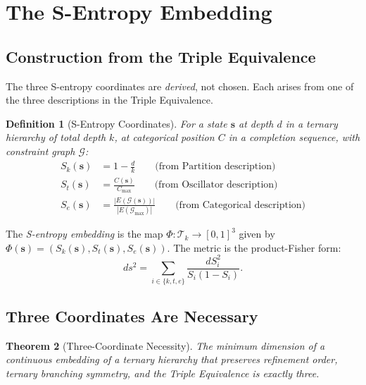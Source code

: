 \documentclass[twocolumn,11pt,a4paper]{article}
\newtheorem{theorem}{Theorem}[section]
\newtheorem{definition}[theorem]{Definition}
\newcommand{\Skk}{S_k}
\newcommand{\Stt}{S_t}
\newcommand{\See}{S_e}
\begin{document}
\section{The S-Entropy Embedding}
\label{sec:s_entropy_embedding}

\subsection{Construction from the Triple Equivalence}

The three S-entropy coordinates are \emph{derived}, not chosen. Each arises from one of the three descriptions in the Triple Equivalence.

\begin{definition}[S-Entropy Coordinates]
\label{def:s_entropy}
For a state $\mathbf{s}$ at depth $d$ in a ternary hierarchy of total depth $k$, at categorical position $C$ in a completion sequence, with constraint graph $\mathcal{G}$:
\begin{align}
\Skk(\mathbf{s}) &= 1 - \frac{d}{k} \qquad \text{(from Partition description)} \\
\Stt(\mathbf{s}) &= \frac{C(\mathbf{s})}{C_{\max}} \qquad \text{(from Oscillator description)} \\
\See(\mathbf{s}) &= \frac{|E(\mathcal{G}(\mathbf{s}))|}{|E(\mathcal{G}_{\max})|} \qquad \text{(from Categorical description)}
\end{align}
\end{definition}

The \emph{S-entropy embedding} is the map $\Phi : \mathcal{T}_k \to [0,1]^3$ given by $\Phi(\mathbf{s}) = (\Skk(\mathbf{s}), \Stt(\mathbf{s}), \See(\mathbf{s}))$. The metric is the product-Fisher form:
\begin{equation}
\label{eq:fisher_metric}
ds^2 = \sum_{i \in \{k, t, e\}} \frac{dS_i^2}{S_i(1 - S_i)}.
\end{equation}

\subsection{Three Coordinates Are Necessary}

\begin{theorem}[Three-Coordinate Necessity]
The minimum dimension of a continuous embedding of a ternary hierarchy that preserves refinement order, ternary branching symmetry, and the Triple Equivalence is exactly three.
\end{theorem}
\end{document}
